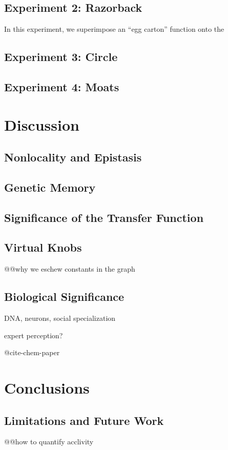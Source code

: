 \documentclass[letterpaper]{article}
\begin{document}
\subsection{Experiment 2: Razorback}

In this experiment, we superimpose an ``egg carton'' function onto the 

\subsection{Experiment 3: Circle}

\subsection{Experiment 4: Moats}

\section{Discussion}

\subsection{Nonlocality and Epistasis}

\subsection{Genetic Memory}

\subsection{Significance of the Transfer Function}

\subsection{Virtual Knobs}

@@why we eschew constants in the graph

\subsection{Biological Significance}

DNA, neurons, social specialization

expert perception?

@cite-chem-paper

\section{Conclusions}

\subsection{Limitations and Future Work}

@@how to quantify acclivity



\end{document}
